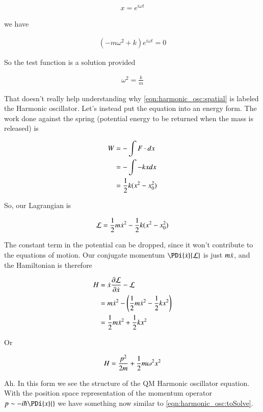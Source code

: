 \begin{align*}
x = e^{i \omega t}
\end{align*}

we have

\begin{align*}
(-m \omega^2 + k) e^{i \omega t} = 0
\end{align*}

So the test function is a solution provided

\begin{align*}
\omega^2 = \frac{k}{m}
\end{align*}

That doesn't really help understanding why \ref{eqn:harmonic_osc:spatial} is labeled the Harmonic oscillator.  Let's instead put the equation into an energy form.  The work done against the spring
(potential energy to be returned when the mass is released) is

\begin{align*}
W 
&= - \int F \cdot dx \\
&= - \int -kx dx \\
&= \frac{1}{2} k (x^2 - x_0^2)
\end{align*}

So, our Lagrangian is

\begin{align*}
\mathcal{L} = \frac{1}{2}m \dot{x}^2 - \frac{1}{2} k (x^2 - x_0^2)
\end{align*}

The constant term in the potential can be dropped, since it won't contribute to the equations of motion.  Our conjugate momentum $\PDi{\xdot}{\LL}$ is just $m \dot{x}$, and the Hamiltonian
is therefore

\begin{align*}
H 
&= \dot{x} \frac{\partial {\mathcal{L}}}{\partial {\dot{x}}} - \mathcal{L} \\
&= m \dot{x}^2  - \left( \frac{1}{2}m \dot{x}^2 - \frac{1}{2} k x^2 \right) \\
&= \frac{1}{2} m \dot{x}^2  + \frac{1}{2} k x^2 \\
\end{align*}

Or

\begin{align*}
H &= \frac{p^2}{2 m } + \frac{1}{2} m \omega^2 x^2 \\
\end{align*}

Ah.  In this form we see the structure of the QM Harmonic oscillator equation.  With the position space representation of the momentum operator $p \sim -i \hbar \PDi{x}{}$ we have
something now similar to \ref{eqn:harmonic_osc:toSolve}.

